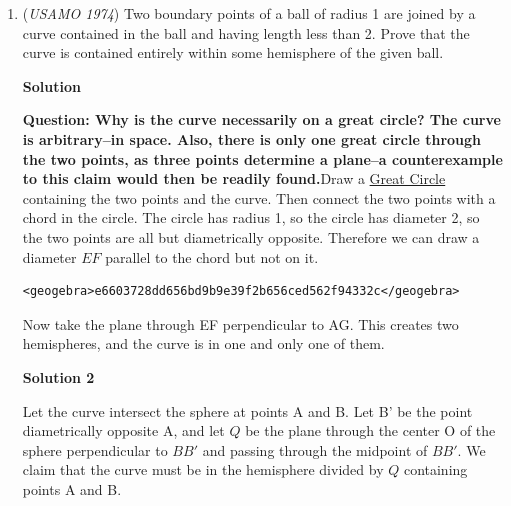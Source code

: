 \begin{enumerate}
 Hence the two results are proved. As in solution 2:

 
 \[(a^ab^bc^c)^3\ge (a^ab^bc^c)(a^bb^cc^a)(a^cb^ac^b)=\left((abc)^{(a+b+c)/3}\right)^3\]

 and through cube roots the result $a^ab^bc^c\ge (abc)^{(a+b+c)/3}$ is obtained.

 


 <i>Alternate solutions are always welcome. If you have a different, elegant solution to this problem, please \href{https://artofproblemsolving.com/wiki/index.php?title=1974\_USAMO\_Problems/Problem\_2&action=edit}{add it} to this page.</i>



	\item (\textit{USAMO 1974}) Two boundary points of a ball of radius 1 are joined by a curve contained in the ball and having length less than 2. Prove that the curve is contained entirely within some hemisphere of the given ball.


 



\textbf{Solution}

\textbf{Question: Why is the curve necessarily on a great circle? The curve is arbitrary–in space. Also, there is only one great circle through the two points, as three points determine a plane–a counterexample to this claim would then be readily found.}Draw a \href{https://artofproblemsolving.com/wiki/index.php?title=Great\_Circle&action=edit&redlink=1}{Great Circle} containing the two points and the curve. Then connect the two points with a chord in the circle. The circle has radius 1, so the circle has diameter 2, so the two points are all but diametrically opposite. Therefore we can draw a diameter $EF$ parallel to the chord but not on it.

 \begin{verbatim}
<geogebra>e6603728dd656bd9b9e39f2b656ced562f94332c</geogebra> 
\end{verbatim}

Now take the plane through EF perpendicular to AG. This creates two hemispheres, and the curve is in one and only one of them.

 



\textbf{Solution 2}

Let the curve intersect the sphere at points A and B. Let B' be the point diametrically opposite A, and let $Q$ be the plane through the center O of the sphere perpendicular to $BB'$ and passing through the midpoint of $BB'$. We claim that the curve must be in the hemisphere divided by $Q$ containing points A and B.


\end{enumerate}

